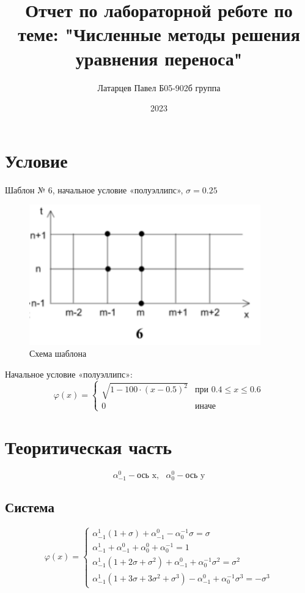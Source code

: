 \documentclass[a4paper, 12pt]{article} %
\title{Отчет по лабораторной реботе по теме: "Численные методы решения уравнения переноса"}
\author{Латарцев Павел Б05-902б группа}
\date{2023}
\begin{document}
\maketitle

\section{Условие} 
Шаблон № 6, начальное условие «полуэллипс», $\sigma = 0.25$

\begin{figure}[h!]
    \centering
    \includegraphics[width=10cm]{shablon.png}
    \caption{Схема шаблона}
    \label{fig:vac}
\end{figure} 

Начальное условие «полуэллипс»:
\begin{equation*}
\varphi(x) = 
 \begin{cases}
   \sqrt{1 - 100 \cdot \left( x - 0.5 \right)^2} &\text{при $0.4 \leqslant x \leqslant 0.6$}\\
   0 &\text{иначе}
 \end{cases}
\end{equation*}


\section{Теоритическая часть}
$$\alpha^{0}_{-1} - \text{ось x}, \,\,\,\, \alpha^{0}_{0} - \text{ось y}$$

\subsection{Система}
\begin{equation*}
\varphi(x) = 
 \begin{cases}
 	\alpha^{1}_{-1}\left(1 + \sigma \right) + \alpha^{0}_{-1} - \alpha^{-1}_{0} \sigma = \sigma  \\  
 	\alpha^{1}_{-1} + \alpha^{0}_{-1} + \alpha^{0}_{0} + \alpha^{-1}_{0}  = 1 \\
 	\alpha^{1}_{-1} \left( 1 + 2\sigma + \sigma^2 \right) + \alpha^{0}_{-1} + \alpha^{-1}_{0}\sigma^2 = \sigma^2 \\
 	\alpha^{1}_{-1} \left( 1 + 3\sigma + 3\sigma^2 + \sigma^3 \right) - \alpha^{0}_{-1} + \alpha^{-1}_{0}\sigma^3 = -\sigma^3 
 \end{cases}
\end{equation*}
\end{document}
